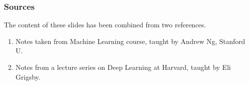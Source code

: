\documentclass{beamer}
\theoremstyle{example}
\begin{document}
\begin{frame}
    \frametitle{Sources}
    The content of these slides has been combined from two references. 

    \begin{enumerate}
        \item Notes taken from Machine Learning course, taught by Andrew Ng, Stanford U.
        \item Notes from a lecture series on Deep Learning at Harvard, taught by Eli Grigsby.
    \end{enumerate}

    \vfill
\end{frame}
\end{document}
